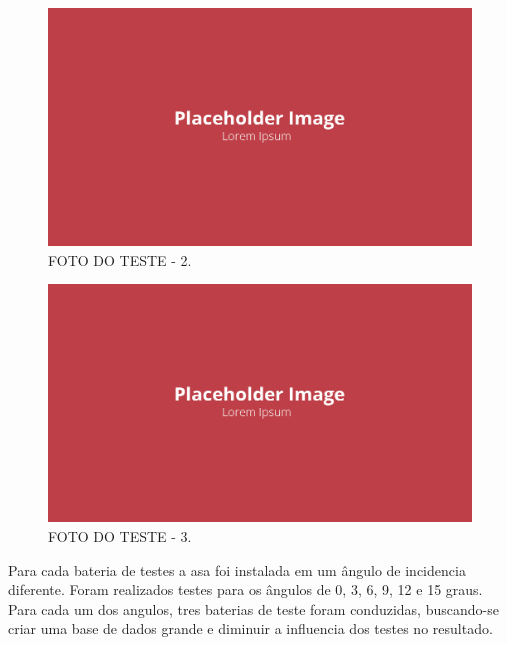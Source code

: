 \begin{figure}[!ht]
    \centering
    \includegraphics[width=.8\linewidth]{figuras/placeholder.png}
    \caption{FOTO DO TESTE - 2\cite{autor}.}
    \label{fig:placeholder}
\end{figure}

\begin{figure}[!ht]
    \centering
    \includegraphics[width=.8\linewidth]{figuras/placeholder.png}
    \caption{FOTO DO TESTE - 3\cite{autor}.}
    \label{fig:placeholder}
\end{figure}

Para cada bateria de testes a asa foi instalada em um ângulo de incidencia diferente. Foram realizados testes para os ângulos de 0, 3, 6, 9, 12 e 15 graus. Para cada um dos angulos, tres baterias de teste foram conduzidas, buscando-se criar uma base de dados grande e diminuir a influencia dos testes no resultado.

